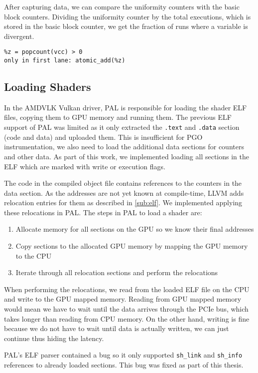 After capturing data, we can compare the uniformity counters with the basic block counters. Dividing the uniformity counter by the total executions, which is stored in the basic block counter, we get the fraction of runs where a variable is divergent.
\begin{lstlisting}[caption={Check a variable for uniformity},language={[x86masm]Assembler}]
%y = %x == read_first_lane
%z = popcount(vcc) > 0
only in first lane: atomic_add(%z)
\end{lstlisting}

\subsection{Loading Shaders}
\label{sub:loading}
In the AMDVLK Vulkan driver, PAL is responsible for loading the shader ELF files, copying them to GPU memory and running them. The previous ELF support of PAL was limited as it only extracted the \texttt{.text} and \texttt{.data} section (code and data) and uploaded them. This is insufficient for PGO instrumentation, we also need to load the additional data sections for counters and other data. As part of this work, we implemented loading all sections in the ELF which are marked with write or execution flags.

The code in the compiled object file contains references to the counters in the data section. As the addresses are not yet known at compile-time, LLVM adds relocation entries for them as described in \cref{sub:elf}. We implemented applying these relocations in PAL. The steps in PAL to load a shader are:
\begin{enumerate}
	\item Allocate memory for all sections on the GPU so we know their final addresses
	\item Copy sections to the allocated GPU memory by mapping the GPU memory to the CPU
	\item Iterate through all relocation sections and perform the relocations
\end{enumerate}
When performing the relocations, we read from the loaded ELF file on the CPU and write to the GPU mapped memory. Reading from GPU mapped memory would mean we have to wait until the data arrives through the PCIe bus, which takes longer than reading from CPU memory. On the other hand, writing is fine because we do not have to wait until data is actually written, we can just continue thus hiding the latency.

PAL's ELF parser contained a bug so it only supported \texttt{sh\_link} and \texttt{sh\_info} references to already loaded sections. This bug was fixed as part of this thesis.

